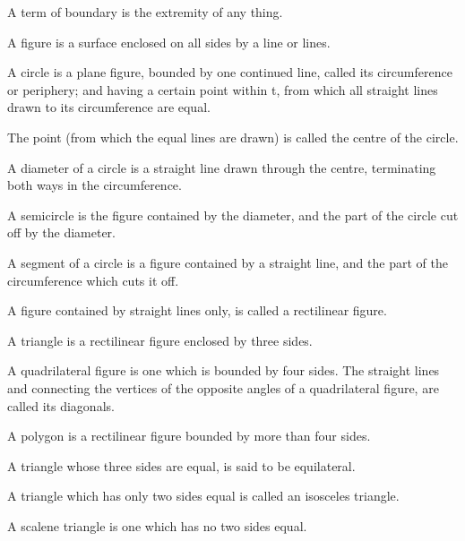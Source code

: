 \begin{bizarrelist}
                \label{def12}
			\item A term of boundary is the extremity of any thing.        
                \label{def13}
			\item A figure is a surface enclosed on all sides by a line or lines.   
                \label{def14}
			\item A circle is a plane figure, bounded by one continued line, called 
                its circumference or periphery; and having a certain point 
                within t, from which all straight lines drawn to its 
                circumference are equal.          \label{def15}
			\item The point (from which the equal lines are drawn) is called the 
                centre of the circle.           \label{def16}
			\item A diameter of a circle is a straight line drawn through the 
                centre, terminating both ways in the circumference.        
                \label{def17}
			\item A semicircle is the figure contained by the diameter, and the 
                part of the circle cut off by the diameter.            \label{def18}
			\item A segment of a circle is a figure contained by a straight line, 
                and the part of the circumference which cuts it off.       
                \label{def19}
			\item A figure contained by straight lines only, is called a 
                rectilinear figure.              \label{def20}
			\item A triangle is a rectilinear figure enclosed by three sides.       
                \label{def21}
			\item A quadrilateral figure is one which is bounded by four sides. The 
                straight lines and connecting the vertices of the opposite 
                angles of a quadrilateral figure, are called its 
                diagonals.                \label{def22}
			\item A polygon is a rectilinear figure bounded by more than four 
                sides.                 \label{def23}
			\item A triangle whose three sides are equal, is said to be 
                equilateral.                  \label{def24}
			\item A triangle which has only two sides equal is called an isosceles 
                triangle.                   \label{def25}
			\item A scalene triangle is one which has no two sides equal.           

\end{bizarrelist}
